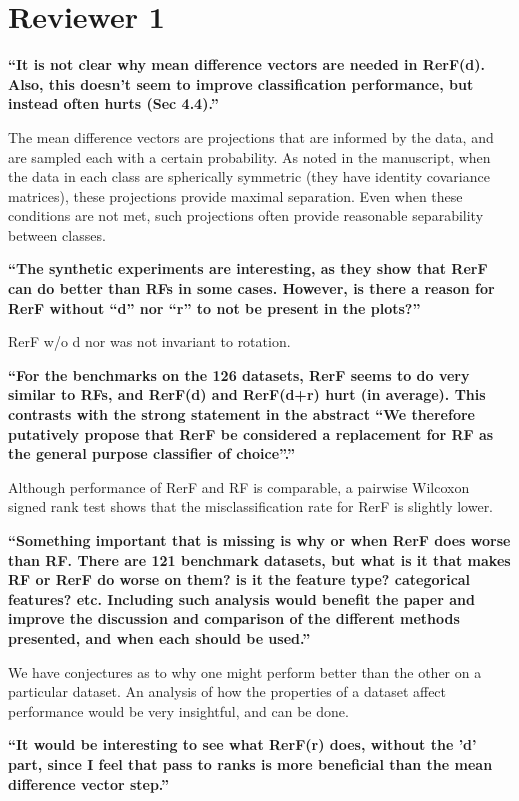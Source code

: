 \section{Reviewer 1}

\textbf{``It is not clear why mean difference vectors are needed in RerF(d). Also, this doesn't seem to improve classification performance, but instead often hurts (Sec 4.4).''}

The mean difference vectors are projections that are informed by the data, and are sampled each with a certain probability. As noted in the manuscript, when the data in each class are spherically symmetric (they have identity covariance matrices), these projections provide maximal separation. Even when these conditions are not met, such projections often provide reasonable separability between classes.

\textbf{``The synthetic experiments are interesting, as they show that RerF can do better than RFs in some cases. However, is there a reason for RerF without ``d'' nor ``r'' to not be present in the plots?''}

RerF w/o d nor was not invariant to rotation.

\textbf{``For the benchmarks on the 126 datasets, RerF seems to do very similar to RFs, and RerF(d) and RerF(d+r) hurt (in average). This contrasts with the strong statement in the abstract ``We therefore putatively propose that RerF be considered a replacement for RF as the general purpose classifier of choice''.''} 

Although performance of RerF and RF is comparable, a pairwise Wilcoxon signed rank test shows that the misclassification rate for RerF is slightly lower.

\textbf{``Something important that is missing is why or when RerF does worse than RF. There are 121 benchmark datasets, but what is it that makes RF or RerF do worse on them? is it the feature type? categorical features? etc. Including such analysis would benefit the paper and improve the discussion and comparison of the different methods presented, and when each should be used.''}

We have conjectures as to why one might perform better than the other on a particular dataset. An analysis of how the properties of a dataset affect performance would be very insightful, and can be done.

\textbf{``It would be interesting to see what RerF(r) does, without the 'd' part, since I feel that pass to ranks is more beneficial than the mean difference vector step.''}

